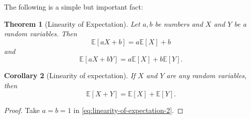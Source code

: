 \documentclass[10pt]{article}
\newtheorem{theorem}{Theorem}
\newtheorem{corollary}[theorem]{Corollary}
\theoremstyle{definition}
\newtheorem{example}[theorem]{Example}
\renewenvironment{example}
{\begin{oldexample}}
  {\par\smallskip\hfill   End of Example~\theexample. $\square$    \par\end{oldexample}}
\newcommand{\1}[1]{\textbf{1}_{\left[#1\right]}} %
\def\E{\mathbb{E}} %
\def\P{\mathbb{P}} %
\begin{document}


The following is a simple but important fact:

\begin{theorem}[Linearity of Expectation]
  \label{prop:linearity-of-expectation}
  Let $a,b$ be numbers and $X$ and $Y$ be a random variables. Then
  \begin{equation*}
    \E\left[aX+b \right] = a \E\left[X \right] +b
  \end{equation*}
  and
  \begin{equation}\label{eq:linearity-of-expectation-2}
    \E\left[aX+bY \right] = a\E\left[X \right]+ b\E\left[Y \right].
  \end{equation}
\end{theorem}

\begin{corollary}[Linearity of expectation]
  If $X$ and $Y$ are any random
  variables, then
  \begin{equation*}
    \E\left[X+Y \right] = \E\left[X \right]+ \E\left[Y \right].
  \end{equation*}
\end{corollary}
\begin{proof}
  Take $a=b=1$ in \cref{eq:linearity-of-expectation-2}.
\end{proof}
\end{document}
